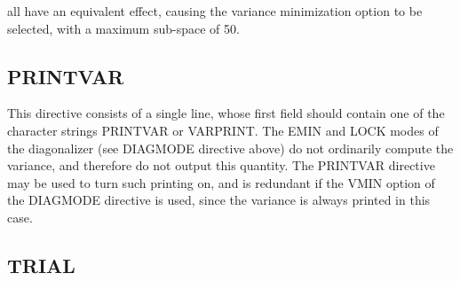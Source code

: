 \documentclass[11pt,fleqn]{article}
\begin{document}
all have an equivalent effect, causing the variance minimization
option to be selected, with a maximum sub-space of 50.

\subsection[PRINTVAR]{PRINTVAR}

This directive consists of a single line, whose first field should
contain one of the character strings PRINTVAR or VARPRINT.
The EMIN and LOCK modes of the diagonalizer (see DIAGMODE directive above)
do not ordinarily compute the variance, and therefore do not output this
quantity. The PRINTVAR directive
may be used to turn such printing on, and is redundant if the VMIN
option of the DIAGMODE directive is used, since the variance is
always printed in this case.

\subsection[TRIAL]{TRIAL}
\end{document}
